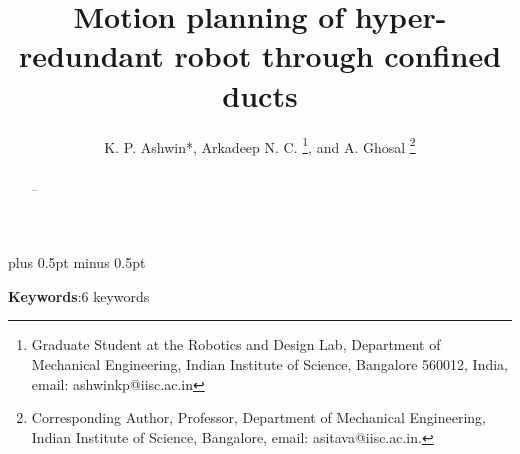 \documentclass[12pt,a4]{article}
\begin{document}
%
\title{Motion planning of hyper-redundant robot through confined ducts}
%
%
\author{K. P. Ashwin*, Arkadeep N. C.
\thanks{Graduate Student at the Robotics and Design Lab, Department
of Mechanical Engineering, Indian Institute of Science, Bangalore 560012, India, email: ashwinkp@iisc.ac.in}, 
 and A. Ghosal
\thanks{Corresponding Author, Professor, Department of Mechanical Engineering, Indian Institute of Science, Bangalore, email: asitava@iisc.ac.in.}}
%
\baselineskip 18pt plus 0.5pt minus 0.5pt
%
\date{}
\maketitle
\begin{abstract}
\label{sec:abstract}
--
\end{abstract}

\textbf{Keywords}:6 keywords
\end{document}
